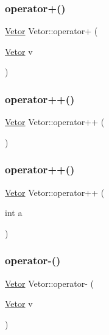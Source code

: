 \mbox{\label{class_vetor_a6c98e035c2164efb70c1e4158ff3a30e}} 
\subsubsection{\texorpdfstring{operator+()}{operator+()}}
{\footnotesize\ttfamily \hyperlink{class_vetor}{Vetor} Vetor\+::operator+ (\begin{DoxyParamCaption}\item[{\hyperlink{class_vetor}{Vetor}}]{v }\end{DoxyParamCaption})}

\mbox{\label{class_vetor_a57108f1730fe7b165e481fcc67e41d74}} 
\subsubsection{\texorpdfstring{operator++()}{operator++()}\hspace{0.1cm}{\footnotesize\ttfamily [1/2]}}
{\footnotesize\ttfamily \hyperlink{class_vetor}{Vetor} Vetor\+::operator++ (\begin{DoxyParamCaption}{ }\end{DoxyParamCaption})}

\mbox{\label{class_vetor_ac542166c6ef82d5d0f10e8a70242ed81}} 
\subsubsection{\texorpdfstring{operator++()}{operator++()}\hspace{0.1cm}{\footnotesize\ttfamily [2/2]}}
{\footnotesize\ttfamily \hyperlink{class_vetor}{Vetor} Vetor\+::operator++ (\begin{DoxyParamCaption}\item[{int}]{a }\end{DoxyParamCaption})}

\mbox{\label{class_vetor_a7e778b3bcf5c142316efc40922f325ff}} 
\subsubsection{\texorpdfstring{operator-\/()}{operator-()}}
{\footnotesize\ttfamily \hyperlink{class_vetor}{Vetor} Vetor\+::operator-\/ (\begin{DoxyParamCaption}\item[{\hyperlink{class_vetor}{Vetor}}]{v }\end{DoxyParamCaption})}

